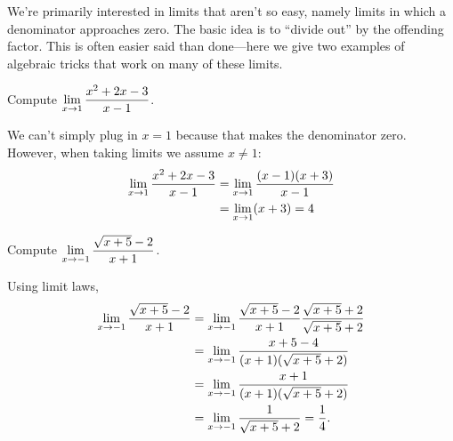 We're primarily interested in limits that aren't so easy, namely
limits in which a denominator approaches zero. The basic idea is to
``divide out'' by the offending factor. This is often easier said than
done---here we give two examples of algebraic tricks that work on many
of these limits.


\begin{example}
Compute $\displaystyle\lim_{x\to1}{x^2+2x-3\over x-1}$. 
\end{example}
\begin{solution}
We can't simply plug in $x=1$ because that makes the denominator zero.
However, when taking limits we assume $x\ne 1$:
\begin{align*}
\lim_{x\to1}{x^2+2x-3\over x-1}&=\lim_{x\to1}{(x-1)(x+3)\over x-1} \\
&=\lim_{x\to1}(x+3)=4
\end{align*}
\end{solution}

\begin{example}
Compute $\displaystyle\lim_{x\to-1} {\sqrt{x+5}-2\over x+1}$.
\end{example}
\begin{solution} 
Using limit laws,
\begin{align*}
\lim_{x\to-1} {\sqrt{x+5}-2\over x+1}&=
\lim_{x\to-1} {\sqrt{x+5}-2\over x+1}{\sqrt{x+5}+2\over \sqrt{x+5}+2} \\
&=\lim_{x\to-1} {x+5-4\over (x+1)(\sqrt{x+5}+2)} \\
&=\lim_{x\to-1} {x+1\over (x+1)(\sqrt{x+5}+2)} \\
&=\lim_{x\to-1} {1\over \sqrt{x+5}+2}={1\over4}.
\end{align*}
\end{solution}



